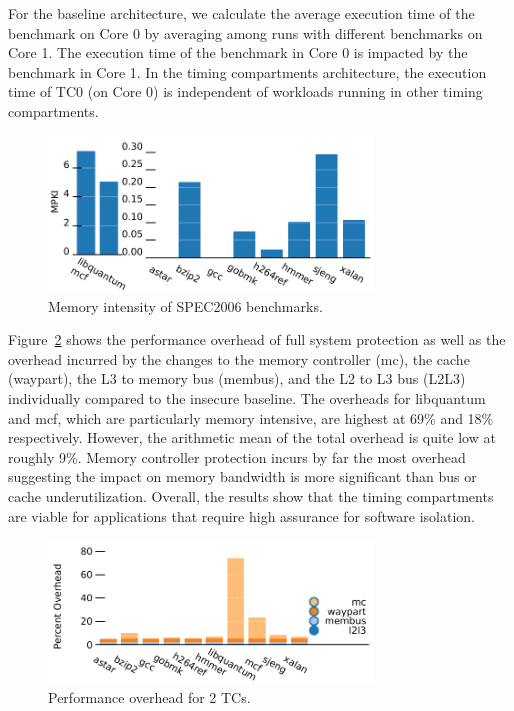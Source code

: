 For the baseline architecture, we calculate the average execution time of the 
benchmark on Core 0 by averaging among runs with different benchmarks on Core 1. 
The execution time of the benchmark in Core 0 is impacted by the benchmark in 
Core 1. In the timing compartments architecture, the execution time of TC0 (on 
Core 0) is independent of workloads running in other timing compartments.

\begin{figure}
    \begin{center}
        \includegraphics[width=3.4in]{figs/mpki_merged.pdf}
        \caption{Memory intensity of SPEC2006 benchmarks.}
        \label{fig:memstudy}
    \end{center}
\end{figure}

Figure~\ref{fig:performance} shows the performance overhead of full system 
protection as well as the overhead incurred by the changes to the memory 
controller (mc), the cache (waypart), the L3 to memory bus (membus), and the L2 
to L3 bus (L2L3) individually compared to the insecure baseline. The
overheads for libquantum and mcf, which are particularly memory intensive, are 
highest at 69\% and 18\% respectively. However, the arithmetic mean of the 
total overhead is quite low at roughly 9\%. Memory controller protection incurs 
by far the most overhead suggesting the impact on memory bandwidth is more 
significant than bus or cache underutilization. Overall, the results show that 
the timing compartments are viable for applications that require high assurance 
for software isolation.

\begin{figure}
    \begin{center}
        \includegraphics[width=3.4in]{figs/breakdown.pdf}
        \caption{Performance overhead for 2 TCs.}
        \label{fig:performance}
    \end{center}
\end{figure}


